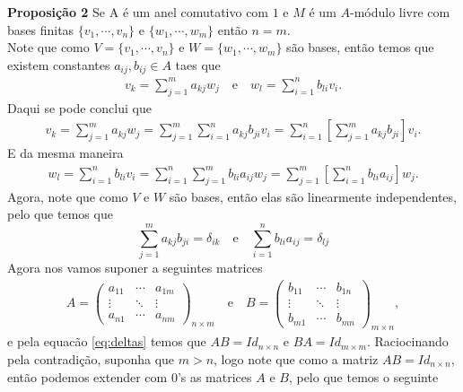 \documentclass{article}
\begin{document}
\textbf{Proposição 2} Se A é um anel comutativo com $1$ e $M$ é um $A$-módulo livre com bases finitas $\{v_1,\cdots, v_n\}$ e $\{w_1,\cdots,w_m\}$ então $n=m$.\\

Note que como $V=\{v_1,\cdots,v_n\}$ e $W=\{w_1,\cdots,w_m\}$ são bases, então temos que existem constantes $a_{ij},b_{ij}\in A$ taes que
\begin{align*}
  v_k=\sum_{j=1}^{m}a_{kj}w_{j}\quad\text{e}\quad w_l=\sum_{i=1}^{n}b_{li}v_{i}.
\end{align*}
Daqui se pode conclui que
\begin{align*}
  v_k=\sum_{j=1}^{m}a_{kj}w_j=\sum_{j=1}^{m}\sum_{i=1}^{n}a_{kj}b_{ji}v_{i}=\sum_{i=1}^{n}\left[\sum_{j=1}^{m}a_{kj}b_{ji}\right]v_{i}.
\end{align*}
E da mesma maneira
\begin{align*}
  w_l=\sum_{i=1}^{n}b_{li}v_i=\sum_{i=1}^{n}\sum_{j=1}^{m}b_{li}a_{ij}w_{j}=\sum_{j=1}^{m}\left[\sum_{i=1}^{n}b_{li}a_{ij}\right]w_{j}.
\end{align*}
Agora, note que como $V$ e $W$ são bases, então elas são linearmente independentes, pelo que temos que
\begin{equation}\label{eq:deltas}
  \sum_{j=1}^{m}a_{kj}b_{ji}=\delta_{ik}\quad\text{e}\quad\sum_{i=1}^{n}b_{li}a_{ij}=\delta_{lj}
\end{equation}
Agora nos vamos suponer a seguintes matrices
\begin{align*}
  A=\begin{pmatrix}
    a_{11} & \cdots & a_{1m}\\
    \vdots & \ddots & \vdots\\
    a_{n1} & \cdots & a_{nm}
  \end{pmatrix}_{n\times m}\quad\text{e}\quad B=\begin{pmatrix}
    b_{11} & \cdots & b_{1n}\\
    \vdots & \ddots & \vdots\\
    b_{m1} & \cdots & b_{mn}
  \end{pmatrix}_{m\times n},
\end{align*}
e pela equacão \eqref{eq:deltas} temos que $AB=Id_{n\times n}$ e $BA=Id_{m\times m}$. Raciocinando pela contradição, suponha que $m>n$, logo note que como a matriz $AB=Id_{n\times n}$, então podemos extender com $0$'s as matrices $A$ e $B$, pelo que temos o seguinte
\end{document}
